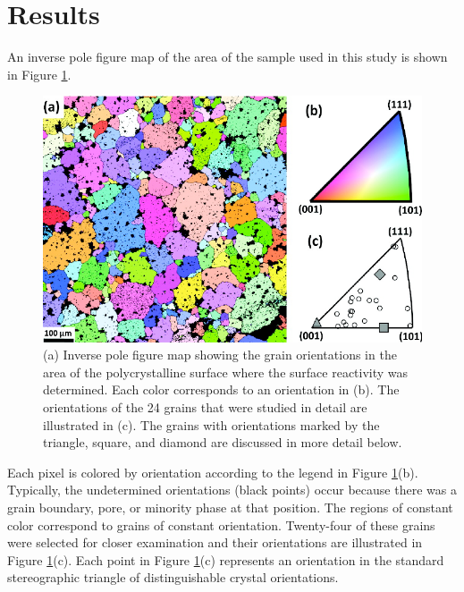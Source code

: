 \section{Results}
\label{sec:ch7results}


An inverse pole figure map of the area of the sample used in this study is shown in Figure
\ref{fig:bfofig1}.
	\begin{figure}
		\includegraphics[width=\textwidth]{bfofig1.pdf}
		\caption[Orientation data for examined  grains]{%
			(a) Inverse pole figure map showing the grain orientations 
			in the area of the polycrystalline  surface where 
			the surface reactivity was determined. Each color corresponds 
			to an orientation in (b). The orientations of the 24 grains 
			that were studied in detail are illustrated in (c). The grains 
			with orientations marked by the triangle, square, and diamond 
			are discussed in more detail below.}
		\label{fig:bfofig1}
\end{figure}
Each pixel is colored by orientation according to the legend in Figure
\ref{fig:bfofig1}(b). Typically, the undetermined orientations (black points) occur
because there was a grain boundary, pore, or minority phase at that position. The regions
of constant color correspond to grains of constant orientation. Twenty-four of these
grains were selected for closer examination and their orientations are illustrated in
Figure \ref{fig:bfofig1}(c). Each point in Figure \ref{fig:bfofig1}(c) represents an
orientation in the standard stereographic triangle of distinguishable crystal
orientations.

